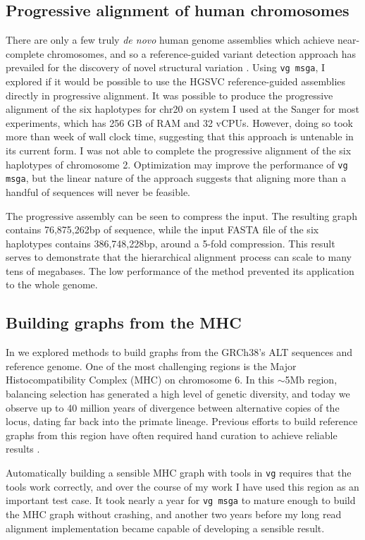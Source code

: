\documentclass[a4paper,12pt,numbered,oneside]{Classes/PhDThesisPSnPDF}
\begin{document}
\subsection{Progressive alignment of human chromosomes}

There are only a few truly \emph{de novo} human genome assemblies which achieve near-complete chromosomes, and so a reference-guided variant detection approach has prevailed for the discovery of novel structural variation \cite{fan2017hysa}.
Using {\tt vg msga}, I explored if it would be possible to use the HGSVC reference-guided assemblies directly in progressive alignment.
It was possible to produce the progressive alignment of the six haplotypes for chr20 on system I used at the Sanger for most experiments, which has 256 GB of RAM and 32 vCPUs.
However, doing so took more than week of wall clock time, suggesting that this approach is untenable in its current form.
I was not able to complete the progressive alignment of the six haplotypes of chromosome 2.
Optimization may improve the performance of {\tt vg msga}, but the linear nature of the approach suggests that aligning more than a handful of sequences will never be feasible.

The progressive assembly can be seen to compress the input.
The resulting graph contains 76,875,262bp of sequence, while the input FASTA file of the six haplotypes contains 386,748,228bp, around a 5-fold compression.
This result serves to demonstrate that the hierarchical alignment process can scale to many tens of megabases.
The low performance of the method prevented its application to the whole genome.

\subsection{Building graphs from the MHC}

In \cite{novak2017genome} we explored methods to build graphs from the GRCh38's ALT sequences and reference genome.
One of the most challenging regions is the Major Histocompatibility Complex (MHC) on chromosome 6.
In this $\sim$5Mb region, balancing selection has generated a high level of genetic diversity, and today we observe up to 40 million years of divergence between alternative copies of the locus, dating far back into the primate lineage.
Previous efforts to build reference graphs from this region have often required hand curation to achieve reliable results \cite{dilthey2015improved}.

Automatically building a sensible MHC graph with tools in {\tt vg} requires that the tools work correctly, and over the course of my work I have used this region as an important test case.
It took nearly a year for {\tt vg msga} to mature enough to build the MHC graph without crashing, and another two years before my long read alignment implementation became capable of developing a sensible result.
\end{document}
